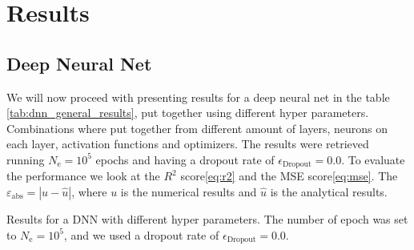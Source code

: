 \section{Results}
\subsection{Deep Neural Net}
We will now proceed with presenting results for a deep neural net in the table \ref{tab:dnn_general_results}, put together using different hyper parameters. Combinations where put together from different amount of layers, neurons on each layer, activation functions and optimizers. The results were retrieved running $N_\mathrm{e}=10^5$ epochs and having a dropout rate of $\epsilon_\mathrm{Dropout}=0.0$. To evaluate the performance we look at the $R^2$ score\eqref{eq:r2} and the MSE score\eqref{eq:mse}. The $\varepsilon_{\mathrm{abs}}=|u - \hat{u}|$, where $u$ is the numerical results and $\hat{u}$ is the analytical results.

\begin{table}[h!tb]
    \centering
    \caption{Results for a DNN with different hyper parameters. The number of epoch was set to $N_\mathrm{e}=10^5$, and we used a dropout rate of $\epsilon_\mathrm{Dropout}=0.0$.}
    \label{tab:dnn_general_results}
\end{table}


